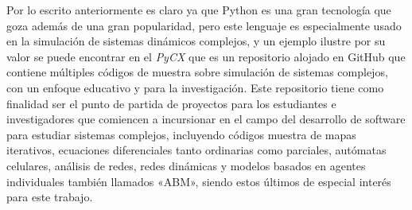 Por lo escrito anteriormente es claro ya que Python es una gran tecnología que goza además de una gran popularidad, pero este lenguaje es especialmente usado en la simulación de sistemas dinámicos complejos, y un ejemplo ilustre por su valor se puede encontrar en el \textit{PyCX} \cite{sayama_2013} que es un repositorio alojado en GitHub que contiene múltiples códigos de muestra sobre simulación de sistemas complejos, con un enfoque educativo y para la investigación. Este repositorio tiene como finalidad ser el punto de partida de proyectos para los estudiantes e investigadores que comiencen a incursionar en el campo del desarrollo de software para estudiar sistemas complejos, incluyendo códigos muestra de mapas iterativos, ecuaciones diferenciales tanto ordinarias como parciales, autómatas celulares, análisis de redes, redes dinámicas y modelos basados en agentes individuales también llamados «ABM», siendo estos últimos de especial interés para este trabajo.